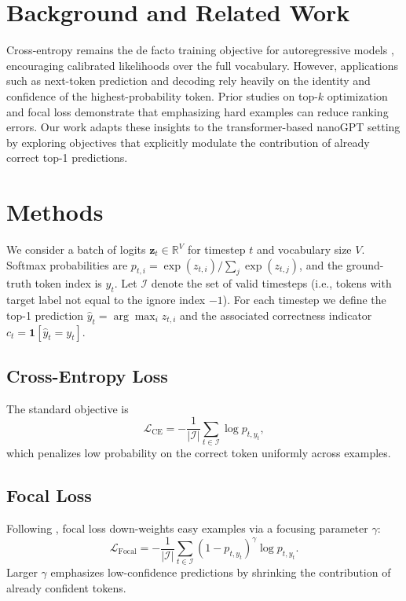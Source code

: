 \documentclass{article}
\begin{document}
\section{Background and Related Work}
Cross-entropy remains the de facto training objective for autoregressive models \citep{goodfellow2016deep}, encouraging calibrated likelihoods over the full vocabulary.
However, applications such as next-token prediction and decoding rely heavily on the identity and confidence of the highest-probability token.
Prior studies on top-$k$ optimization \citep{lapin2016topk} and focal loss \citep{lin2017focal} demonstrate that emphasizing hard examples can reduce ranking errors.
Our work adapts these insights to the transformer-based nanoGPT setting by exploring objectives that explicitly modulate the contribution of already correct top-1 predictions.

\section{Methods}
We consider a batch of logits $\mathbf{z}_{t} \in \mathbb{R}^{V}$ for timestep $t$ and vocabulary size $V$.
Softmax probabilities are $p_{t,i} = \exp(z_{t,i}) / \sum_{j} \exp(z_{t,j})$, and the ground-truth token index is $y_t$.
Let $\mathcal{I}$ denote the set of valid timesteps (i.e., tokens with target label not equal to the ignore index $-1$).
For each timestep we define the top-1 prediction $\hat{y}_t = \arg\max_i z_{t,i}$ and the associated correctness indicator $c_t = \mathbf{1}[\hat{y}_t = y_t]$.

\subsection{Cross-Entropy Loss}
The standard objective is
\begin{equation}
\label{eq:ce}
\mathcal{L}_{\mathrm{CE}} = - \frac{1}{|\mathcal{I}|} \sum_{t \in \mathcal{I}} \log p_{t,y_t},
\end{equation}
which penalizes low probability on the correct token uniformly across examples.

\subsection{Focal Loss}
Following \citet{lin2017focal}, focal loss down-weights easy examples via a focusing parameter $\gamma$:
\begin{equation}
\label{eq:focal}
\mathcal{L}_{\mathrm{Focal}} = - \frac{1}{|\mathcal{I}|} \sum_{t \in \mathcal{I}} \left(1 - p_{t,y_t}\right)^{\gamma} \log p_{t,y_t}.
\end{equation}
Larger $\gamma$ emphasizes low-confidence predictions by shrinking the contribution of already confident tokens.
\end{document}
